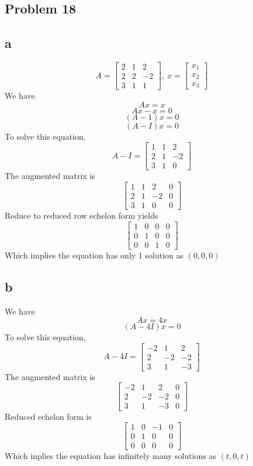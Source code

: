 \documentclass[a4paper,12pt]{report}
\begin{document}
\subsection*{Problem 18}
\subsection*{a}
\[A=
\begin{bmatrix}
    2       & 1 & 2 \\
    2       & 2 & -2\\
    3       & 1 & 1
\end{bmatrix}
,\: x=\begin{bmatrix}
    x_1 \\
    x_2\\
    x_3
\end{bmatrix}
\]
We have
\[Ax=x\]
\[Ax-x=0\]
\[(A-1)x=0\]
\[(A-I)x=0\]
To solve this equation,
\[A-I=
\begin{bmatrix}
    1       & 1 & 2 \\
    2       & 1 & -2\\
    3       & 1 & 0
\end{bmatrix}
\]
The augmented matrix is
\[
\begin{bmatrix}
    1       & 1 & 2 & 0 \\
    2       & 1 & -2 & 0\\
    3       & 1 & 0 & 0
\end{bmatrix}\]
Reduce to reduced row echelon form yields
\[
\begin{bmatrix}
    1       & 0 & 0 & 0 \\
    0       & 1 & 0 & 0\\
    0       & 0 & 1 & 0
\end{bmatrix}
\]
Which implies the equation has only 1 solution as \((0,0,0)\)
\subsection*{b}
We have
\[Ax=4x\]
\[(A-4I)x=0\]
To solve this equation,
\[
A-4I=
\begin{bmatrix}
    -2       & 1 & 2\\
    2       & -2 & -2 \\
    3       & 1 & -3 
\end{bmatrix}\]
The augmented matrix is
\[
\begin{bmatrix}
    -2       & 1 & 2 & 0 \\
    2       & -2 & -2 & 0\\
    3       & 1 & -3 & 0
\end{bmatrix}
\]
Reduced echelon form is
\[
\begin{bmatrix}
    1       & 0 & -1 & 0 \\
    0       & 1 & 0 & 0\\
    0       & 0 & 0 & 0
\end{bmatrix}
\]
Which inplies the equation has infinitely many solutions as \((t,0,t)\)
\end{document}
